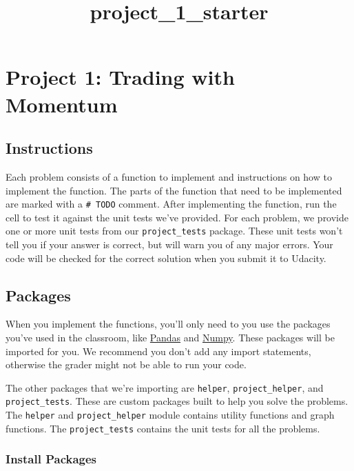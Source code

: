 \documentclass[11pt]{article}
\title{project\_1\_starter}
\begin{document}
    
    
    \maketitle
    
    

    
    \section{Project 1: Trading with
Momentum}\label{project-1-trading-with-momentum}

\subsection{Instructions}\label{instructions}

Each problem consists of a function to implement and instructions on how
to implement the function. The parts of the function that need to be
implemented are marked with a \texttt{\#\ TODO} comment. After
implementing the function, run the cell to test it against the unit
tests we've provided. For each problem, we provide one or more unit
tests from our \texttt{project\_tests} package. These unit tests won't
tell you if your answer is correct, but will warn you of any major
errors. Your code will be checked for the correct solution when you
submit it to Udacity.

\subsection{Packages}\label{packages}

When you implement the functions, you'll only need to you use the
packages you've used in the classroom, like
\href{https://pandas.pydata.org/}{Pandas} and
\href{http://www.numpy.org/}{Numpy}. These packages will be imported for
you. We recommend you don't add any import statements, otherwise the
grader might not be able to run your code.

The other packages that we're importing are \texttt{helper},
\texttt{project\_helper}, and \texttt{project\_tests}. These are custom
packages built to help you solve the problems. The \texttt{helper} and
\texttt{project\_helper} module contains utility functions and graph
functions. The \texttt{project\_tests} contains the unit tests for all
the problems.

\subsubsection{Install Packages}\label{install-packages}
\end{document}
